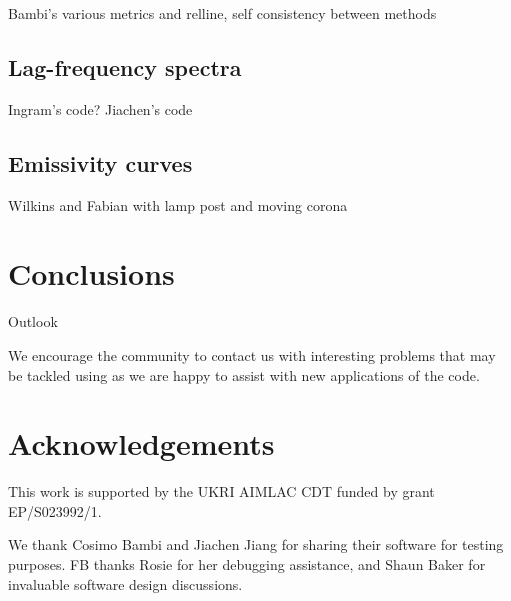 \documentclass[fleqn,usenatbib]{mnras}
\begin{document}
Bambi's various metrics and relline, self consistency between methods

\subsection{Lag-frequency spectra}

Ingram's code? Jiachen's code

\subsection{Emissivity curves}

Wilkins and Fabian with lamp post and moving corona






\section{Conclusions}

Outlook

We encourage the community to contact us with interesting problems that may be tackled using \Gradus as we are happy to assist with new applications of the code.


\section*{Acknowledgements}
This work is supported by the UKRI AIMLAC CDT funded by grant EP/S023992/1.

We thank Cosimo Bambi and Jiachen Jiang for sharing their software for testing purposes. FB thanks Rosie for her debugging assistance, and Shaun Baker for invaluable software design discussions.
\end{document}
